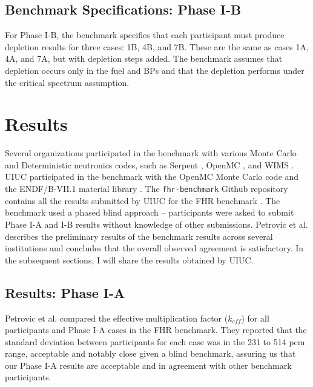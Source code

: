 \subsection{Benchmark Specifications: Phase I-B}
For Phase I-B, the benchmark specifies that each participant must produce 
depletion results for three cases: 1B, 4B, and 7B. 
These are the same as cases 1A, 4A, and 7A, but with depletion steps added. 
The benchmark assumes that depletion occurs only in the fuel and \glspl{BP} and 
that the depletion performs under the critical spectrum assumption. 

\section{Results}
Several organizations participated in the benchmark with various Monte Carlo
and Deterministic neutronics codes, such as Serpent \cite{leppanen_serpent_2014}, 
OpenMC \cite{romano_openmc_2013}, and WIMS \cite{lindley_current_2017}. 
\gls{UIUC} participated in the benchmark with the OpenMC Monte Carlo code 
\cite{romano_openmc_2013} and the ENDF/B-VII.1 material library 
\cite{chadwick_endf/b-vii.1_2011}.
The \texttt{fhr-benchmark} Github repository contains all the results submitted 
by \gls{UIUC} for the \gls{FHR} benchmark \cite{chee_arfcfhr-benchmark_2021}. 
The benchmark used a phased blind approach -- participants were asked to 
submit Phase I-A and I-B results without knowledge of other submissions. 
Petrovic et al. \cite{petrovic_preliminary_2021} describes the preliminary 
results of the benchmark results across several institutions and concludes 
that the overall observed agreement is satisfactory. 
In the subsequent sections, I will share the results obtained by \gls{UIUC}.  

\subsection{Results: Phase I-A}
Petrovic et al. \cite{petrovic_preliminary_2021} compared the effective 
multiplication factor ($k_{eff}$) for all participants and Phase I-A cases in 
the \gls{FHR} benchmark. 
They reported that the standard deviation between participants for each case 
was in the 231 to 514 pcm range, acceptable and notably close given a blind 
benchmark, assuring us that our Phase I-A results are acceptable and in agreement 
with other benchmark participants. 

